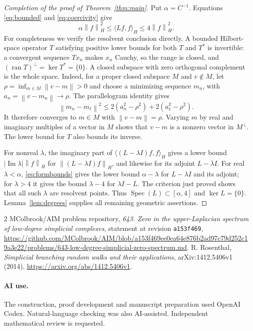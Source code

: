 \documentclass[11pt]{article}
\newcommand{\Spec}{\operatorname{Spec}}
\newcommand{\norm}[1]{\left\lVert#1\right\rVert}
\newcommand{\ip}[2]{\langle#1,#2\rangle}
\begin{document}
\begin{proof}[Completion of the proof of Theorem~\ref{thm:main}]
Put $\alpha=C^{-1}$. Equations \eqref{eq:bounded} and \eqref{eq:coercivity}
give
\begin{equation}\label{eq:formbounds}
 \alpha\norm{f}_H^2\leq\ip{Lf}{f}_H\leq4\norm{f}_H^2.
\end{equation}
For completeness we verify the resolvent conclusion directly. A bounded
Hilbert-space operator $T$ satisfying positive lower bounds for both $T$ and
$T^*$ is invertible: a convergent sequence $Tx_n$ makes $x_n$ Cauchy, so the
range is closed, and $(\operatorname{ran}T)^\perp=\ker T^*=\{0\}$.
A closed subspace with zero orthogonal complement is the whole space. Indeed,
for a proper closed subspace $M$ and $v\notin M$, let
$\rho=\inf_{m\in M}\norm{v-m}>0$ and choose a minimizing sequence $m_n$,
with $a_n=\norm{v-m_n}\to\rho$. The parallelogram identity gives
\[
 \norm{m_n-m_\ell}^2
 \leq2(a_n^2-\rho^2)+2(a_\ell^2-\rho^2).
\]
It therefore converges to $m\in M$ with $\norm{v-m}=\rho$. Varying $m$ by
real and imaginary multiples of a vector in $M$ shows that $v-m$ is a
nonzero vector in $M^\perp$. The lower bound for $T$ also bounds its inverse.

For nonreal $\lambda$, the imaginary part of
$\ip{(L-\lambda I)f}{f}_H$ gives a lower bound
$|\operatorname{Im}\lambda|\norm{f}_H$ for
$\norm{(L-\lambda I)f}_H$, and likewise for its adjoint
$L-\overline\lambda I$. For real $\lambda<\alpha$, \eqref{eq:formbounds}
gives the lower bound $\alpha-\lambda$ for $L-\lambda I$ and its adjoint;
for $\lambda>4$ it gives the bound $\lambda-4$ for $\lambda I-L$.
The criterion just proved shows that all such $\lambda$ are resolvent
points. Thus $\Spec(L)\subset[\alpha,4]$ and $\ker L=\{0\}$.
Lemma~\ref{lem:degrees} supplies all remaining geometric assertions.
\end{proof}

\begin{thebibliography}{2}
MColbrook/AIM problem repository,
\emph{643. Zero in the upper-Laplacian spectrum of low-degree simplicial
complexes}, statement at revision \texttt{a153f469},
\url{https://github.com/MColbrook/AIM/blob/a153f469ee0ea64e876b2ad97c79d252c19a3e22/problems/643-low-degree-simplicial-zero-spectrum.md}.
R. Rosenthal,
\emph{Simplicial branching random walks and their applications},
arXiv:1412.5406v1 (2014),
\url{https://arxiv.org/abs/1412.5406v1}.
\end{thebibliography}

\paragraph{AI use.}
The construction, proof development and manuscript preparation used
OpenAI Codex. Natural-language checking was also AI-assisted. Independent
mathematical review is requested.
\end{document}
